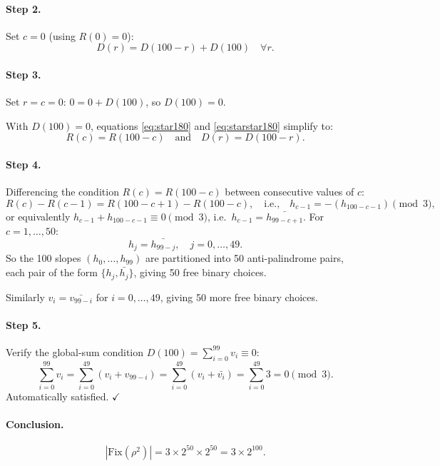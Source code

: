 \documentclass{article}
\newcommand{\Fix}{\mathrm{Fix}}
\newcommand{\comp}[1]{\bar{#1}}   %
\begin{document}
\paragraph{Step 2.} Set $c=0$ (using $R(0)=0$):
\begin{equation}
  D(r) = D(100-r)+D(100)\quad\forall r.
  \tag{$\star\star$}
  \label{eq:starstar180}
\end{equation}

\paragraph{Step 3.} Set $r=c=0$:
$0 = 0 + D(100)$, so $D(100) = 0$.

With $D(100)=0$, equations \eqref{eq:star180} and
\eqref{eq:starstar180} simplify to:
\[
  R(c) = R(100-c)\quad\text{and}\quad D(r) = D(100-r).
\]

\paragraph{Step 4.}
Differencing the condition $R(c) = R(100-c)$ between
consecutive values of $c$:
\[
  R(c)-R(c-1) = R(100-c+1)-R(100-c),
  \quad\text{i.e.,}\quad h_{c-1} = -(h_{100-c-1})\pmod3,
\]
or equivalently $h_{c-1} + h_{100-c-1}\equiv 0\pmod3$, i.e.\
$h_{c-1} = \comp{h_{99-c+1}}$.  For $c=1,\ldots,50$:
\begin{equation}
  h_j = \comp{h_{99-j}},\quad j=0,\ldots,49.
  \label{eq:180hcond}
\end{equation}
So the 100 slopes $(h_0,\ldots,h_{99})$ are partitioned into
50 anti-palindrome pairs, each pair of the form
$\{h_j, \comp{h_j}\}$, giving 50 free binary choices.

Similarly $v_i = \comp{v_{99-i}}$ for $i=0,\ldots,49$,
giving 50 more free binary choices.

\paragraph{Step 5.} Verify the global-sum condition
$D(100) = \sum_{i=0}^{99}v_i\equiv 0$:
\[
  \sum_{i=0}^{99}v_i
  = \sum_{i=0}^{49}(v_i+v_{99-i})
  = \sum_{i=0}^{49}(v_i+\comp{v_i})
  = \sum_{i=0}^{49}3 = 0\pmod3.
\]
Automatically satisfied. $\checkmark$

\paragraph{Conclusion.}
\[
  |\Fix(\rho^2)| = 3\times 2^{50}\times 2^{50}
  = 3\times 2^{100}.
\]
\end{document}
